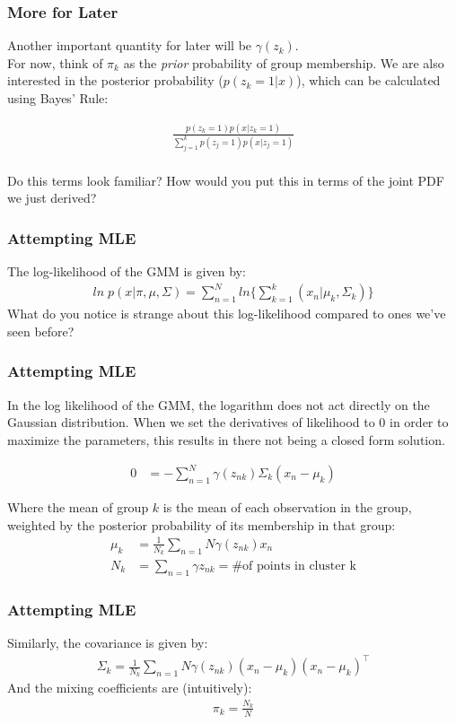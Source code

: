 \documentclass{beamer}
\begin{document}
\begin{frame}
\frametitle{More for Later}
Another important quantity for later will be $\gamma(z_k)$.\\
For now, think of $\pi_k$ as the \textit{prior} probability of group membership. We are also interested in the posterior probability ($p(z_k = 1|x) $), which can be calculated using Bayes' Rule:

\begin{align*}
  \frac{p(z_k = 1) p(x|z_k =1 )}{\sum_{j = 1}^{k} p(z_j = 1) p(x|z_j=1)}\\
\end{align*}

Do this terms look familiar? How would you put this in terms of the joint PDF we just derived?
\end{frame}

\begin{frame}
	\frametitle{Attempting MLE}
	The log-likelihood of the GMM is given by:
	\begin{align*}
	ln\; p(x|\pi, \mu, \Sigma) = \sum_{n=1}^{N} ln\{\sum_{k=1}^{k} (x_n | \mu_k, \Sigma_k) \}
	\end{align*}
	What do you notice is strange about this log-likelihood compared to ones we've seen before?
\end{frame}

\begin{frame}
\frametitle{Attempting MLE}
	In the log likelihood of the GMM, the logarithm does not act directly on the Gaussian distribution. When we set the derivatives of likelihood to $0$ in order to maximize the parameters, this results in there not being a closed form solution.
	
	\begin{align*}
	 0&= -\sum_{n=1}^{N} \gamma(z_{nk}) \Sigma_k(x_n - \mu_k)
	\end{align*}
	
	Where the mean of group $k$ is the mean of each observation in the group, weighted by the posterior probability of its membership in that group:
	\begin{align*}
		 \mu_k &= \frac{1}{N_k} \sum_{n=1}{N} \gamma(z_{nk})x_n \\
		 N_k &= \sum_{n=1} \gamma{z_{nk}} = \text{\# of points in cluster k}
	\end{align*}
	
\end{frame}

\begin{frame}
\frametitle{Attempting MLE}	
	Similarly, the covariance is given by:
	\begin{align*}
	\Sigma_k = \frac{1}{N_k} \sum_{n=1}{N} \gamma(z_{nk})(x_n - \mu_k)(x_n - \mu_k)^\intercal
	\end{align*}
	And the mixing coefficients are (intuitively):
	\begin{align*}
	\pi_k = \frac{N_k}{N}
	\end{align*}
\end{frame}
\end{document}
